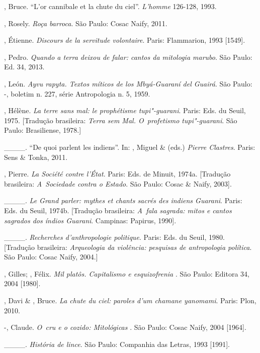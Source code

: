 \begin{Parskip}
, Bruce. ``L’or cannibale et la chute du ciel''. \emph{L’homme} 126-128,
1993.

 , Rosely. \emph{Roça barroca}. São Paulo: Cosac Naify, 2011.

, Étienne. \emph{Discours de la servitude volontaire}. Paris:
Flammarion, 1993 [1549].

, Pedro. \emph{Quando a terra deixou de falar: cantos da mitologia
marubo}. São Paulo: Ed. 34, 2013.

, León. \emph{Ayvu rapyta. Textos míticos de los Mbyá-Guaraní del
Guairá}. São Paulo: -, boletim n. 227, série Antropologia n. 5,
1959.

, Hélène. \emph{La terre sans mal: le prophétisme tupi"-guarani}. Paris:
Eds. du Seuil, 1975. [Tradução brasileira: \emph{Terra sem Mal. O~profetismo
tupi"-guarani}. São Paulo: Brasiliense, 1978.]

\_\_\_\_. ``De quoi parlent les indiens''. In: , Miguel \& 
(eds.) \emph{Pierre Clastres}. Paris: Sens \& Tonka, 2011.

, Pierre. \emph{La Société contre l’État}. Paris: Eds. de Minuit,
1974a. [Tradução brasileira: \emph{A~Sociedade contra o Estado}. São Paulo:
Cosac \& Naify, 2003].

\_\_\_\_. \emph{Le Grand parler: mythes et chants sacrés des indiens Guarani}.
Paris: Eds. du Seuil, 1974b. [Tradução brasileira: \emph{A~fala sagrada:
mitos e cantos sagrados dos índios Guarani}. Campinas: Papirus, 1990]. 

\_\_\_\_. \emph{Recherches d’anthropologie politique}. Paris: Eds. du Seuil, 1980.
[Tradução brasileira: \emph{Arqueologia da violência: pesquisas de
antropologia política}. São Paulo: Cosac Naify, 2004.] 

, Gilles; , Félix. \emph{Mil platôs. Capitalismo e
esquizofrenia }. São Paulo: Editora 34, 2004 [1980].

, Davi \& , Bruce. \emph{La chute du ciel: paroles d’um chamane
yanomami}. Paris: Plon, 2010.

-, Claude. \emph{O~cru e o cozido: Mitológicas }. São Paulo: Cosac
Naify, 2004 [1964].

\_\_\_\_. \emph{História de lince}. São Paulo: Companhia das Letras, 1993 [1991]. 


\end{Parskip}
